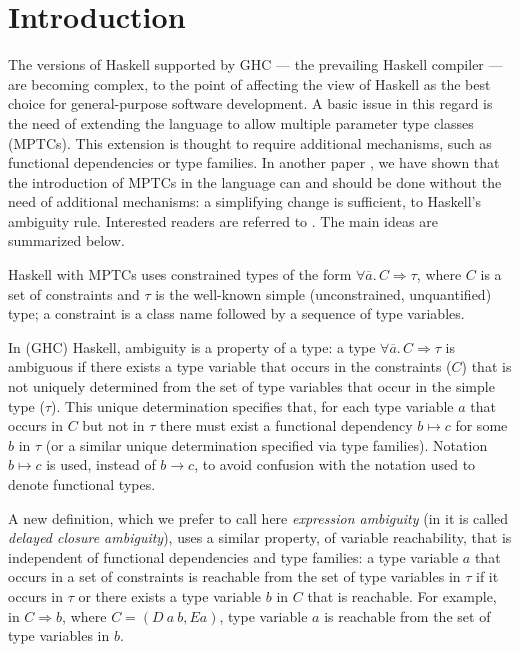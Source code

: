 \section{Introduction}
\label{sec:intro}

The versions of Haskell supported by GHC \cite{GHC} --- the prevailing
Haskell compiler --- are becoming complex, to the point of affecting
the view of Haskell as the best choice for general-purpose software
development. A basic issue in this regard is the need of extending the
language to allow multiple parameter type classes (MPTCs). This
extension is thought to require additional mechanisms, such as
functional dependencies or type families. In another paper
\cite{JBCS-Ambiguity-and-constrained-polymorphism}, we have shown that
the introduction of MPTCs in the language can and should be done
without the need of additional mechanisms: a simplifying change is
sufficient, to Haskell's ambiguity rule. Interested readers are
referred to \cite{JBCS-Ambiguity-and-constrained-polymorphism}. The
main ideas are summarized below.

Haskell with MPTCs uses constrained types of the form $\forall
\overline{a}.\,C \Rightarrow \tau$, where $C$ is a set of constraints
and $\tau$ is the well-known simple (unconstrained, unquantified)
type; a constraint is a class name followed by a sequence of type
variables.

In (GHC) Haskell, ambiguity is a property of a type: a type $\forall
\overline{a}.\,C \Rightarrow \tau$ is ambiguous if there exists a type
variable that occurs in the constraints ($C$) that is not uniquely
determined from the set of type variables that occur in the simple
type ($\tau$). This unique determination specifies that, for each type
variable $a$ that occurs in $C$ but not in $\tau$ there must exist a
functional dependency $b \mapsto c$ for some $b$ in $\tau$ (or a
similar unique determination specified via type families). Notation $b
\mapsto c$ is used, instead of $b \rightarrow c$, to avoid confusion
with the notation used to denote functional types.

A new definition, which we prefer to call here {\em expression
  ambiguity\/} (in \cite{JBCS-Ambiguity-and-constrained-polymorphism}
it is called {\em delayed closure ambiguity\/}), uses a similar
property, of variable reachability, that is independent of functional
dependencies and type families: a type variable $a$ that occurs in a
set of constraints is reachable from the set of type variables in
$\tau$ if it occurs in $\tau$ or there exists a type variable $b$ in
$C$ that is reachable. For example, in $C \Rightarrow b$, where
$C=(D\: a\: b, E a)$, type variable $a$ is reachable from the set of
type variables in $b$.

